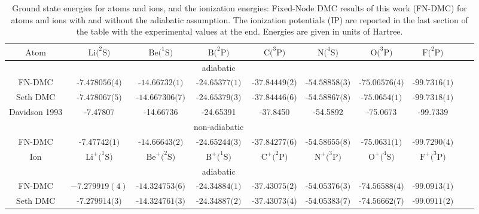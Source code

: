 \documentclass[pra,superscriptaddress,groupedaddress,twocolumn]{revtex4}
\begin{document}
\begin{table}[t!]
\setlength{\extrarowheight}{1pt}
\begin{threeparttable}
\caption{Ground state energies for atoms and ions, and the ionization energies: Fixed-Node DMC results of this work (FN-DMC) for atoms and ions with and without the adiabatic assumption. The ionization potentials (IP) are reported in the last section of the table with the experimental values at the end. Energies are given in units of Hartree. \label{tab:ionization}}
\begin{tabular*}{\textwidth}{@{\extracolsep{\fill}} cccccccccc}
\hline\hline
$\text{Atom}$ & $\text{Li}(^2\text{S)}$ & $\text{Be}(^1\text{S)}$ & $\text{B}(^2\text{P)}$ & $\text{C}(^3\text{P)}$ & $\text{N}(^4\text{S)}$ & $\text{O}(^3\text{P)}$ & $\text{F}(^2\text{P)}$ \\ \hline
&&&adiabatic&&&& \\
FN-DMC & $\text{-7.478056(4)}$ & $\text{-14.66732(1)}$ & $\text{-24.65377(1)}$ & $\text{-37.84449(2)}$ & $\text{-54.58858(3)}$ & $\text{-75.06576(4)}$ & $\text{-99.7316(1)}$ \\
Seth DMC \cite{Seth_Bench} & $\text{-7.478067(5)}$ & $\text{-14.667306(7)}$ & $\text{-24.65379(3)}$ & $\text{-37.84446(6)}$ & $\text{-54.58867(8)}$ & $\text{-75.0654(1)}$ & $\text{-99.7318(1)}$ \\
Davidson 1993 \cite{Davidson_Atoms} &  -7.47807 & -14.66736 & -24.65391 & -37.8450 &-54.5892 & -75.0673 & -99.7339 \\
&&&non-adiabatic&&&& \\
FN-DMC & $\text{-7.47742(1)}$ & $\text{-14.66643(2)}$ & $\text{-24.65244(3)}$ & $\text{-37.84277(6)}$ & $\text{-54.58655(8)}$ & $\text{-75.0631(1)}$ & $\text{-99.7290(4)}$ \\
\hline
$\text{Ion}$ & $\text{Li}^+(^1\text{S)}$ & $\text{Be}^+(^2\text{S)}$ & $\text{B}^+(^1\text{S)}$ & $\text{C}^+(^2\text{P)}$ & $\text{N}^+(^3\text{P)}$ & $\text{O}^+(^4\text{S)}$ & $\text{F}^+(^3\text{P)}$ \\ \hline
&&&adiabatic&&&& \\
FN-DMC & $-7.279919(4)$ & $\text{-14.324753(6)}$ & $\text{-24.34884(1)}$ & $\text{-37.43075(2)}$ & $\text{-54.05376(3)}$ & $\text{-74.56588(4)}$ & $\text{-99.0913(1)}$ \\
Seth DMC \cite{Seth_Bench} & $\text{-7.279914(3)}$ & $\text{-14.324761(3)}$ & $\text{-24.34887(2)}$ & $\text{-37.43073(4)}$ & $\text{-54.05383(7)}$ & $\text{-74.56662(7)}$ & $\text{-99.0911(2)}$ \\

\end{tabular*}
\end{threeparttable}
\end{table}
\end{document}
